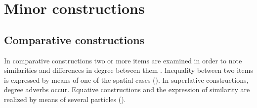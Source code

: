 \chapter{Minor constructions}
\label{cpt:Minor constructions}



\section{Comparative constructions}
\label{sec:Comparative constructions}

In comparative constructions two or more items are examined in order to note similarities and differences in degree between them \citep[787]{Dixon2008}. Inequality between two items is expressed by means of one of the spatial cases (). In superlative constructions, degree adverbs occur. Equative constructions and the expression of similarity are realized by means of several particles ().

